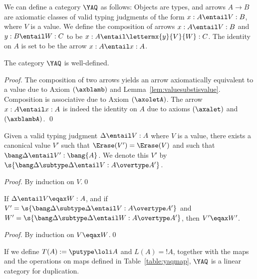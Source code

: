 \documentclass{llncs}
\begin{document}
\begin{definition}\label{def:yaq}\rm
  We can define a category $\YAQ$ as follows: Objects are types,
  and arrows $A\to B$ are axiomatic classes of valid typing judgments of
  the form $x:A\entail V:B$, where $V$ is a value. We define the
  composition of arrows $x:A\entail V:B$ and $y:B\entail W:C$ to be
  $x:A\entail\lettermx{y}{V}{W}:C$. The identity on $A$ is set to be
  the arrow $x:A\entail x:A$.
\end{definition}

\begin{lemma}\label{lem:yaq}
  The category $\YAQ$ is well-defined.
\end{lemma}

\begin{proof}
  The composition of two arrows yields an arrow axiomatically
  equivalent to a value due to Axiom $(\axblamb)$ and
  Lemma~\ref{lem:valuesubstisvalue}. Composition is associative due to
  Axiom $(\axoletA)$. The arrow $x:A\entail x:A$ is indeed the
  identity on $A$ due to axioms $(\axalet)$ and $(\axblambA)$.
  \qed
\end{proof}




\begin{lemma}\label{lem:promote}
  Given a valid typing judgment $\Delta\entail V:A$ where $V$ is a
  value, there exists a canonical value $V'$ such that
  $\Erase(V')=\Erase(V)$ and such that $\bang\Delta\entail
  V':\bang{A}$. We denote this $V'$ by
  $\s{\bang\Delta\subtype\Delta\entail V:A\overtype A'}$.
\end{lemma}

\begin{proof}
  By induction on $V$.\qed
\end{proof}


\begin{lemma}\label{lem:bangexaq}
  If $\Delta\entail V\eqax W:A$, and if $V'=\s{\bang\Delta\subtype\Delta
  \entail V:A\overtype A'}$ and $W'=\s{\bang\Delta\subtype\Delta
  \entail W:A\overtype A'}$, then $V'\eqax W'$.
\end{lemma}

\begin{proof}
  By induction on $V\eqax W$.\qed
\end{proof}


\begin{theorem}
  If we define $T(A) := \putype\loli A$ and $L(A)=!A$, together with
  the maps and the operations on maps defined in
  Table~\ref{table:yaqmap}, $\YAQ$ is a linear category for
  duplication.
\end{theorem}
\end{document}

